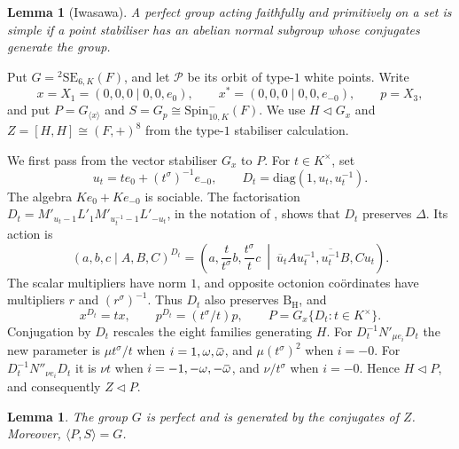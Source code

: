 \documentclass{amsart}
\def\ombb{\mathord{\mbox{\hspace*{0pt}}\;\!\overline{\!\!\:\omega\!\!\:}\;\!}\mbox{\hspace*{0pt}}}
\newcommand{\diag}{\mathrm{diag}}
\newcommand{\SE}{\mathrm{SE}}
\newcommand{\Spin}{\mathrm{Spin}}
\renewcommand{\bar}{\overline}
\newcommand{\B}{\mathrm{B}}
\renewcommand{\H}{\mathrm{H}}
\newcommand{\s}{\sigma}
\newcommand{\fdet}{\Delta}
\theoremstyle{plain}
\numberwithin{theorem}{section}
\newtheorem{lemma}[theorem]{Lemma}
\theoremstyle{definition}
\begin{document}
\begin{lemma}[Iwasawa]
    A perfect group acting faithfully and primitively on a set is simple
    if a point stabiliser has an abelian normal subgroup whose conjugates
    generate the group.
\end{lemma}

Put $G={}^2\SE_{6,K}(F)$, and let $\mathcal P$ be its orbit of type-$1$
white points. Write
\[
    x=X_1=(0,0,0\mid0,0,e_0),\qquad
    x^*=(0,0,0\mid0,0,e_{-0}),\qquad p=X_3,
\]
and put $P=G_{\langle x\rangle}$ and $S=G_p\cong\Spin^-_{10,K}(F)$.
We use $H\lhd G_x$ and $Z=[H,H]\cong(F,+)^8$ from the
type-$1$ stabiliser calculation.

We first pass from the vector stabiliser $G_x$ to $P$. For $t\in K^\times$, set
\begin{equation}
    \label{eq:simplicity_diagonal}
    u_t=t e_0+(t^{\s})^{-1}e_{-0},\qquad
    D_t=\diag(1,u_t,u_t^{-1}).
\end{equation}
The algebra $Ke_0+Ke_{-0}$ is sociable. The factorisation
$D_t=M'_{u_t-1}L'_1M'_{u_t^{-1}-1}L'_{-u_t}$, in the notation of
\cite[Section~6]{BSW1}, shows that $D_t$ preserves $\fdet$. Its action is
\[
    (a,b,c\mid A,B,C)^{D_t}
    =\left(a,\frac{t}{t^{\s}}b,\frac{t^{\s}}t c\ \middle|\
      \bar u_t A u_t^{-1},\overline{u_t^{-1}}B,Cu_t\right).
\]
The scalar multipliers have norm $1$, and opposite octonion
co\"ordinates have multipliers $r$ and $(r^{\s})^{-1}$.
Thus $D_t$ also preserves $\B_{\H}$, and
\[
    x^{D_t}=tx,\qquad p^{D_t}=(t^{\s}/t)p,\qquad
    P=G_x\{D_t:t\in K^\times\}.
\]
Conjugation by $D_t$ rescales the eight families generating $H$.
For $D_t^{-1}N'_{\mu e_i}D_t$ the new parameter is
$\mu t^{\s}/t$ when $i=1,\omega,\ombb$, and $\mu(t^{\s})^2$ when
$i=-0$. For $D_t^{-1}N''_{\nu e_i}D_t$ it is $\nu t$ when
$i=-1,-\omega,-\ombb$, and $\nu/t^{\s}$ when $i=-0$.
Hence $H\lhd P$, and consequently $Z\lhd P$.

\begin{lemma}
    \label{lemma:simplicity_generation}
    The group $G$ is perfect and is generated by the conjugates of $Z$.
    Moreover, $\langle P,S\rangle=G$.
\end{lemma}
\end{document}
